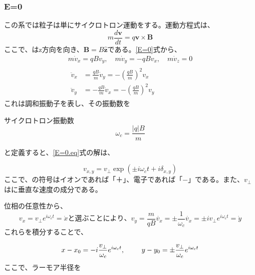\documentclass{ltjsarticle}
\numberwithin{equation}{section} %
\begin{document}
\subsubsection{E=0}
この系では粒子は単にサイクロトロン運動をする。運動方程式は、
\begin{equation}
  m\frac{d\bm{v}}{dt} = q\bm{v}\times \bm{B} \label{E=0}
\end{equation}
ここで、はz方向を向き、$\bm{B}=B\bm{\hat{z}}$である。\eqref{E=0}式から、
\begin{equation}
\begin{gathered}
  m\dot{v}_x = qB v_y, \quad
  m\dot{v}_y = -qB v_x, \quad
  m\dot{v}_z = 0 \\
  \begin{aligned}
    \ddot{v}_x &= \frac{qB}{m}\dot{v}_y = -\left(\frac{qB}{m}\right)^2 v_x \\
    \ddot{v}_y &= -\frac{qB}{m}\dot{v}_x = -\left(\frac{qB}{m}\right)^2 v_y \label{E=0.eq}
  \end{aligned}
\end{gathered}
\end{equation} 
これは調和振動子を表し、その振動数を

\begin{eqbox}{サイクロトロン振動数}
\begin{equation}
  \omega_c = \frac{|q|B}{m} \label{cyclon}
\end{equation}
\end{eqbox}  
と定義すると、\eqref{E=0.eq}式の解は、

\[
v_{x,y} = v_\perp \exp(\pm i\omega_ct + i\delta_{x,y})
\]
ここで、\pm の符号はイオンであれば「＋」、電子であれば「−」である。また、$v_\perp$はに垂直な速度の成分である。

位相の任意性から、
\begin{subequations}
  \begin{equation}
    v_x = v_\perp e^{i\omega_c t} = \dot{x} \label{normal.x}
  \end{equation}
と選ぶことにより、
  \begin{equation}
    v_y = \frac{m}{qB}\dot{v_x} = \pm \frac{1}{\omega_c}\dot{v_x} = \pm iv_\perp e^{i\omega_c t} = \dot{y} \label{normal.y}
  \end{equation}
\end{subequations}
これらを積分することで、

\begin{equation}
  x - x_0 = -i\frac{v_\perp}{\omega_c}e^{i\omega_c t}, \hspace{2pc} y -y_0 = \pm \frac{v_\perp}{\omega_c}e^{i\omega_c t} \label{larmor.eq}
\end{equation}
ここで、ラーモア半径を
\end{document}
